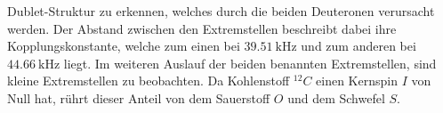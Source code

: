 Dublet-Struktur zu erkennen,
welches durch die beiden Deuteronen verursacht werden. Der Abstand zwischen den
Extremstellen beschreibt dabei ihre Kopplungskonstante, welche zum einen bei
$\SI{39,51}{\kilo\hertz}$ und zum anderen bei $\SI{44,66}{\kilo\hertz}$ liegt.
Im weiteren Auslauf der beiden benannten Extremstellen, sind kleine Extremstellen
zu beobachten. Da Kohlenstoff $^{12}C$ einen Kernspin $I$ von Null hat, rührt
dieser Anteil von dem Sauerstoff $O$ und dem Schwefel $S$.
